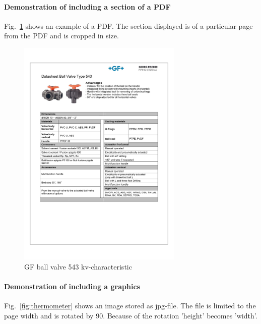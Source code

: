 \paragraph{Demonstration of including a section of a PDF}
Fig.~\ref{fig:GF543kv} shows an example of a PDF. The section displayed is of a particular page from the PDF and is cropped in size.
\begin{figure}
	\centering
	\includegraphics[width=0.7\textwidth,page=6, trim = 25mm 172mm 25mm 45mm, clip]{600-Appendices/Examples/Datasheet_GF_543}
	\caption{GF ball valve 543 kv-characteristic}
	\label{fig:GF543kv}
\end{figure}

\paragraph{Demonstration of including a graphics}
Fig.~\ref{fig:thermometer} shows an image stored as jpg-file. The file is limited to the page width and is rotated by 90\textdegree. Because of the rotation 'height' becomes 'width'.


